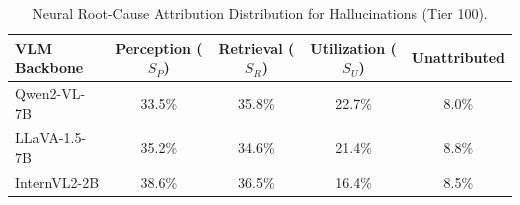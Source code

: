 \begin{table}[t]
\centering
\small
\caption{Neural Root-Cause Attribution Distribution for Hallucinations (Tier 100).}
\label{tab:cause_attribution}
\begin{tabular}{lcccc}
\toprule
\textbf{VLM Backbone} & \textbf{Perception ($S_P$)} & \textbf{Retrieval ($S_R$)} & \textbf{Utilization ($S_U$)} & \textbf{Unattributed} \\
\midrule
Qwen2-VL-7B & 33.5\% & 35.8\% & 22.7\% & 8.0\% \\
LLaVA-1.5-7B & 35.2\% & 34.6\% & 21.4\% & 8.8\% \\
InternVL2-2B & 38.6\% & 36.5\% & 16.4\% & 8.5\% \\
\bottomrule
\end{tabular}
\end{table}